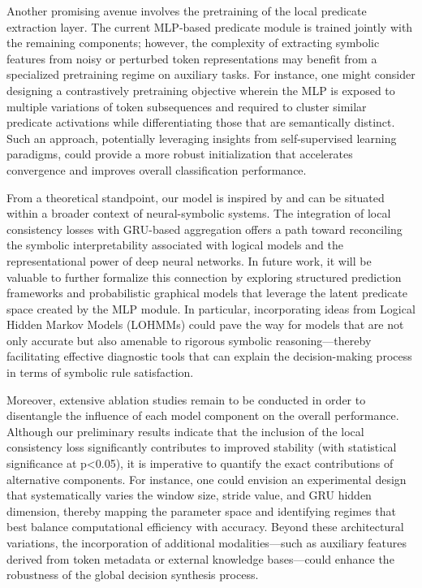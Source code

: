 \documentclass[11pt]{article}
\begin{document}
Another promising avenue involves the pretraining of the local predicate extraction layer. The current MLP-based predicate module is trained jointly with the remaining components; however, the complexity of extracting symbolic features from noisy or perturbed token representations may benefit from a specialized pretraining regime on auxiliary tasks. For instance, one might consider designing a contrastively pretraining objective wherein the MLP is exposed to multiple variations of token subsequences and required to cluster similar predicate activations while differentiating those that are semantically distinct. Such an approach, potentially leveraging insights from self-supervised learning paradigms, could provide a more robust initialization that accelerates convergence and improves overall classification performance.

From a theoretical standpoint, our model is inspired by and can be situated within a broader context of neural-symbolic systems. The integration of local consistency losses with GRU-based aggregation offers a path toward reconciling the symbolic interpretability associated with logical models and the representational power of deep neural networks. In future work, it will be valuable to further formalize this connection by exploring structured prediction frameworks and probabilistic graphical models that leverage the latent predicate space created by the MLP module. In particular, incorporating ideas from Logical Hidden Markov Models (LOHMMs) could pave the way for models that are not only accurate but also amenable to rigorous symbolic reasoning—thereby facilitating effective diagnostic tools that can explain the decision-making process in terms of symbolic rule satisfaction.

Moreover, extensive ablation studies remain to be conducted in order to disentangle the influence of each model component on the overall performance. Although our preliminary results indicate that the inclusion of the local consistency loss significantly contributes to improved stability (with statistical significance at p<0.05), it is imperative to quantify the exact contributions of alternative components. For instance, one could envision an experimental design that systematically varies the window size, stride value, and GRU hidden dimension, thereby mapping the parameter space and identifying regimes that best balance computational efficiency with accuracy. Beyond these architectural variations, the incorporation of additional modalities—such as auxiliary features derived from token metadata or external knowledge bases—could enhance the robustness of the global decision synthesis process.
\end{document}

